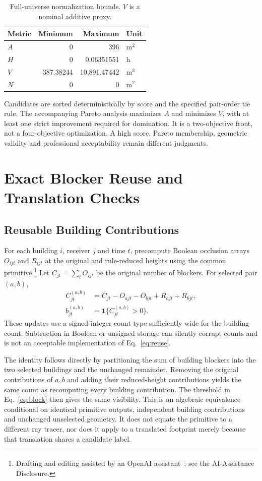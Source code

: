 \documentclass{llncs}
\newcommand{\aidraft}{\footnote{Drafting and editing assisted by an OpenAI assistant~\cite{openai2026}; see the AI-Assistance Disclosure.}}
\newcommand{\ind}{\mathbf{1}}
\begin{document}
\begin{table}[tbp]
\caption{Full-universe normalization bounds. $V$ is a nominal additive proxy.}
\label{tab:bounds}\centering
\begin{tabular}{lrrl}\toprule
Metric & Minimum & Maximum & Unit\\\midrule
$A$ & 0 & 396 & m$^2$\\
$H$ & 0 & 0.06351551 & h\\
$V$ & 387.38244 & 10,891.47442 & m$^3$\\
$N$ & 0 & 0 & m$^2$\\\bottomrule
\end{tabular}
\end{table}

Candidates are sorted deterministically by score and the specified pair-order tie rule. The accompanying Pareto analysis maximizes $A$ and minimizes $V$, with at least one strict improvement required for domination. It is a two-objective front, not a four-objective optimization. A high score, Pareto membership, geometric validity and professional acceptability remain different judgments.

\section{Exact Blocker Reuse and Translation Checks}
\subsection{Reusable Building Contributions}
For each building $i$, receiver $j$ and time $t$, precompute Boolean occlusion arrays $O_{ijt}$ and $R_{ijt}$ at the original and rule-reduced heights using the common primitive.\aidraft{} Let $C_{jt}=\sum_i O_{ijt}$ be the original number of blockers. For selected pair $(a,b)$,
\begin{align}
 C_{jt}^{(a,b)}&=C_{jt}-O_{ajt}-O_{bjt}+R_{ajt}+R_{bjt},\label{eq:reuse}\\
 b_{jt}^{(a,b)}&=\ind\{C_{jt}^{(a,b)}>0\}.\label{eq:block}
\end{align}
These updates use a signed integer count type sufficiently wide for the building count. Subtraction in Boolean or unsigned storage can silently corrupt counts and is not an acceptable implementation of Eq.~\ref{eq:reuse}.

The identity follows directly by partitioning the sum of building blockers into the two selected buildings and the unchanged remainder. Removing the original contributions of $a,b$ and adding their reduced-height contributions yields the same count as recomputing every building contribution. The threshold in Eq.~\ref{eq:block} then gives the same visibility. This is an algebraic equivalence conditional on identical primitive outputs, independent building contributions and unchanged unselected geometry. It does not equate the primitive to a different ray tracer, nor does it apply to a translated footprint merely because that translation shares a candidate label.
\end{document}
